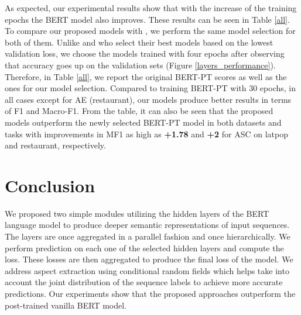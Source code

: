 \documentclass{article}
\begin{document}
As expected, our experimental results show that with the increase of the training epochs the BERT model also improves. These results can be seen in Table \ref{all}. To compare our proposed models with \cite{xu2019bert}, we perform the same model selection for both of them. Unlike \cite{xu2019bert} and \cite{karimi2020adversarial} who select their best models based on the lowest validation loss, we choose the models trained with four epochs after observing that accuracy goes up on the validation sets (Figure \ref{layers_performance}). Therefore, in Table \ref{all}, we report the original BERT-PT scores as well as the ones for our model selection. Compared to training BERT-PT with 30 epochs, in all cases except for AE (restaurant), our models produce better results in terms of F1 and Macro-F1. From the table, it can also be seen that the proposed models outperform the newly selected BERT-PT model in both datasets and tasks with improvements in MF1 as high as \textbf{+1.78} and \textbf{+2} for ASC on latpop and restaurant, respectively. 

\section{Conclusion}

We proposed two simple modules utilizing the hidden layers of the BERT language model to produce deeper semantic representations of input sequences. The layers are once aggregated in a parallel fashion and once hierarchically. We perform prediction on each one of the selected hidden layers and compute the loss. These losses are then aggregated to produce the final loss of the model. We address aspect extraction using conditional random fields which helps take into account the joint distribution of the sequence labels to achieve more accurate predictions. Our experiments show that the proposed approaches outperform the post-trained vanilla BERT model. 



\end{document}
